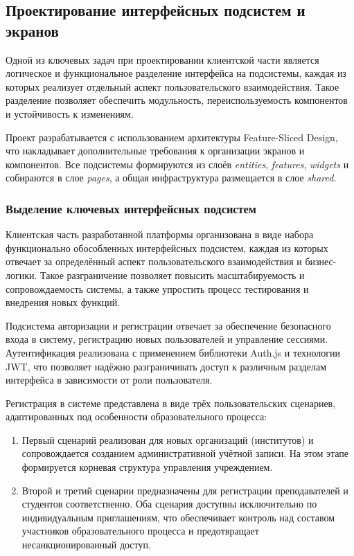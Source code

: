 \subsection{Проектирование интерфейсных подсистем и экранов}

Одной из ключевых задач при проектировании клиентской части является логическое и функциональное разделение интерфейса на подсистемы, каждая из которых реализует отдельный аспект пользовательского взаимодействия. Такое разделение позволяет обеспечить модульность, переиспользуемость компонентов и устойчивость к изменениям.

Проект разрабатывается с использованием архитектуры Feature-Sliced Design, что накладывает дополнительные требования к организации экранов и компонентов. Все подсистемы формируются из слоёв \textit{entities}, \textit{features}, \textit{widgets} и собираются в слое \textit{pages}, а общая инфраструктура размещается в слое \textit{shared}.

\subsubsection{Выделение ключевых интерфейсных подсистем}

Клиентская часть разработанной платформы организована в виде набора функционально обособленных интерфейсных подсистем, каждая из которых отвечает за определённый аспект пользовательского взаимодействия и бизнес-логики. Такое разграничение позволяет повысить масштабируемость и сопровождаемость системы, а также упростить процесс тестирования и внедрения новых функций.

Подсистема авторизации и регистрации отвечает за обеспечение безопасного входа в систему, регистрацию новых пользователей и управление сессиями. Аутентификация реализована с применением библиотеки Auth.js и технологии JWT, что позволяет надёжно разграничивать доступ к различным разделам интерфейса в зависимости от роли пользователя.

Регистрация в системе представлена в виде трёх пользовательских сценариев, адаптированных под особенности образовательного процесса:
\begin{enumerate}
\item Первый сценарий реализован для новых организаций (институтов) и сопровождается созданием административной учётной записи. На этом этапе формируется корневая структура управления учреждением.
\item Второй и третий сценарии предназначены для регистрации преподавателей и студентов соответственно. Оба сценария доступны исключительно по индивидуальным приглашениям, что обеспечивает контроль над составом участников образовательного процесса и предотвращает несанкционированный доступ.
\end{enumerate}

